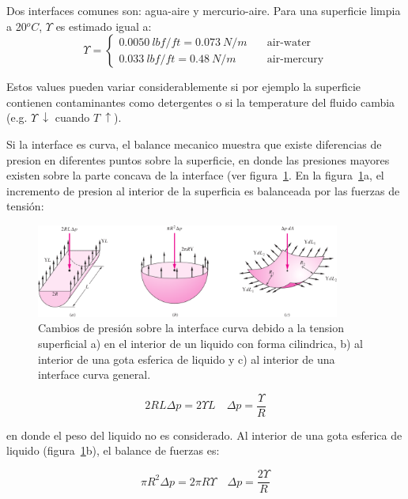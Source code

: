 \documentclass[10pt, oneside]{article}
\begin{document}
Dos interfaces comunes son: agua-aire y mercurio-aire. Para una superficie limpia a 20$^oC$, $\Upsilon$ es estimado igual a:
\begin{equation}
\Upsilon =
\begin{cases}
0.0050\ lbf/ft = 0.073\ N/m & \quad \text{air-water} \\
0.033\ lbf/ft = 0.48\ N/m& \quad \text{air-mercury} 
\end{cases}
\end{equation}

Estos values pueden variar considerablemente si por ejemplo la superficie contienen contaminantes como detergentes o si la temperature del fluido cambia (e.g. $\Upsilon\ \downarrow$ cuando $T\ \uparrow$).

Si la interface es curva, el balance mecanico muestra que existe diferencias de presion en diferentes puntos sobre la superficie, en donde las presiones mayores existen sobre la parte concava de la interface (ver figura~\ref{tesu}. En la figura~\ref{tesu}a, el incremento de presion al interior de la superficia es balanceada por las fuerzas de tensi\'on:

\begin{figure}[h]
\centering
\includegraphics[width=10cm]{tesu}
\caption{Cambios de presi\'on sobre la interface curva debido a la tension superficial a) en el interior de un liquido con forma cilindrica, b) al interior de una gota esferica de liquido y c) al interior de una interface curva general.}
\label{tesu}
\end{figure}

\begin{equation}
2RL \Delta p = 2 \Upsilon L \quad \Delta p = \frac{\Upsilon}{R}
\end{equation}

en donde el peso del liquido no es considerado. Al interior de una gota esferica de liquido (figura~\ref{tesu}b), el balance de fuerzas es:

\begin{equation}
\pi R^2 \Delta p = 2 \pi R \Upsilon \quad \Delta p = \frac{2\Upsilon}{R}
\end{equation}
\end{document}
